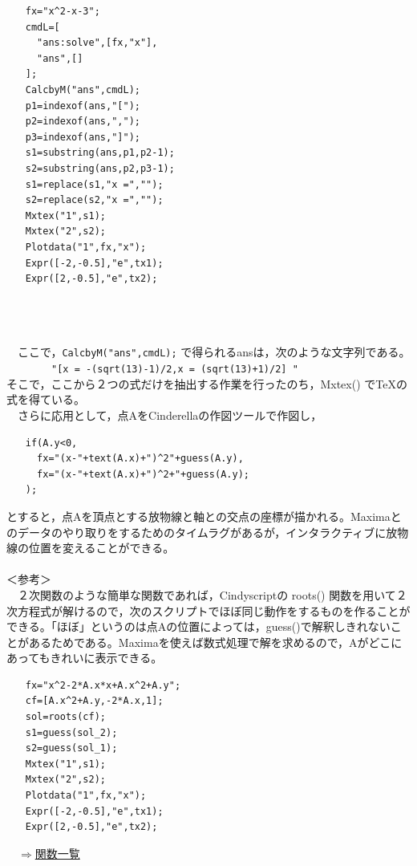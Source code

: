 \documentclass[papersize,a4paper,12pt,uplatex]{jsarticle}
\begin{document}
\begin{description}
\begin{verbatim}
　　fx="x^2-x-3";
　　cmdL=[
　　  "ans:solve",[fx,"x"],
　　  "ans",[]
　　];
　　CalcbyM("ans",cmdL);
　　p1=indexof(ans,"[");
　　p2=indexof(ans,",");
　　p3=indexof(ans,"]");
　　s1=substring(ans,p1,p2-1);
　　s2=substring(ans,p2,p3-1);
　　s1=replace(s1,"x =","");
　　s2=replace(s2,"x =","");
　　Mxtex("1",s1);
　　Mxtex("2",s2);
　　Plotdata("1",fx,"x");
　　Expr([-2,-0.5],"e",tx1);
　　Expr([2,-0.5],"e",tx2);
\end{verbatim}
　\\
　　　　　　　\\
　\\
　ここで，\verb|CalcbyM("ans",cmdL);| で得られるansは，次のような文字列である。\\
　　　　\verb|"[x = -(sqrt(13)-1)/2,x = (sqrt(13)+1)/2] "|\\
そこで，ここから２つの式だけを抽出する作業を行ったのち，Mxtex() でTeXの式を得ている。\\
　さらに応用として，点AをCinderellaの作図ツールで作図し，
\begin{verbatim}
　　if(A.y<0,
　　  fx="(x-"+text(A.x)+")^2"+guess(A.y),
　　  fx="(x-"+text(A.x)+")^2+"+guess(A.y);
　　);
\end{verbatim}
とすると，点Aを頂点とする放物線と軸との交点の座標が描かれる。Maximaとのデータのやり取りをするためのタイムラグがあるが，インタラクティブに放物線の位置を変えることができる。\\
　\\
＜参考＞\\
　２次関数のような簡単な関数であれば，Cindyscriptの roots() 関数を用いて２次方程式が解けるので，次のスクリプトでほぼ同じ動作をするものを作ることができる。「ほぼ」というのは点Aの位置によっては，guess()で解釈しきれないことがあるためである。Maximaを使えば数式処理で解を求めるので，Aがどこにあってもきれいに表示できる。
\begin{verbatim}
　　fx="x^2-2*A.x*x+A.x^2+A.y";
　　cf=[A.x^2+A.y,-2*A.x,1];
　　sol=roots(cf);
　　s1=guess(sol_2);
　　s2=guess(sol_1);
　　Mxtex("1",s1);
　　Mxtex("2",s2);
　　Plotdata("1",fx,"x");
　　Expr([-2,-0.5],"e",tx1);
　　Expr([2,-0.5],"e",tx2);
\end{verbatim}

\end{description}

\begin{flushright}　\hyperlink{functionlist}{$\Rightarrow$関数一覧}\end{flushright}
\newpage
\end{document}
